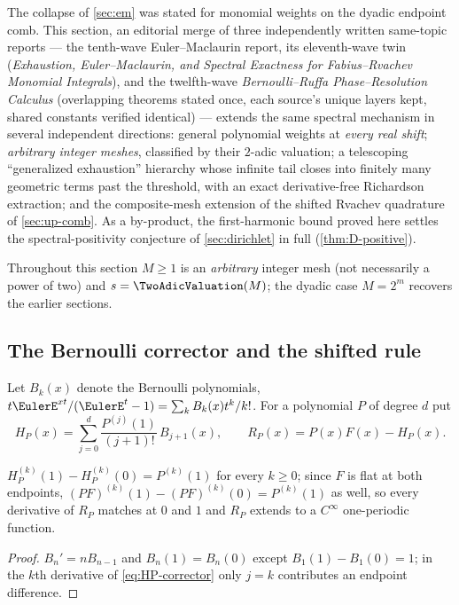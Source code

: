 \documentclass[11pt,oneside]{article}
\numberwithin{equation}{section}
\theoremstyle{definition}
\theoremstyle{remark}
\begin{document}
The collapse of \cref{sec:em} was stated for monomial weights on the
dyadic endpoint comb.  This section, an editorial merge of three
independently written same-topic reports --- the tenth-wave
Euler--Maclaurin report, its eleventh-wave twin (\emph{Exhaustion,
Euler--Maclaurin, and Spectral Exactness for Fabius--Rvachev Monomial
Integrals}), and the twelfth-wave \emph{Bernoulli--Ruffa
Phase--Resolution Calculus} (overlapping theorems stated once, each
source's unique layers kept, shared constants verified identical) ---
extends the same spectral mechanism in several independent
directions: general polynomial weights at \emph{every real
shift}; \emph{arbitrary integer meshes}, classified by their $2$-adic
valuation; a telescoping ``generalized exhaustion'' hierarchy whose
infinite tail closes into finitely many geometric terms past the
threshold, with an exact derivative-free Richardson extraction; and the
composite-mesh extension of the shifted Rvachev quadrature of
\cref{sec:up-comb}.  As a by-product, the first-harmonic bound proved
here settles the spectral-positivity conjecture of
\cref{sec:dirichlet} in full (\cref{thm:D-positive}).

Throughout this section $M\ge1$ is an \emph{arbitrary} integer mesh
(not necessarily a power of two) and $s=\TwoAdicValuation(M)$; the dyadic case
$M=2^{m}$ recovers the earlier sections.

\subsection{The Bernoulli corrector and the shifted rule}

Let $B_k(x)$ denote the Bernoulli polynomials,
$t\EulerE^{xt}/(\EulerE^t-1)=\sum_kB_k(x)t^k/k!$.  For a polynomial $P$ of
degree $d$ put
\begin{equation}
 H_P(x)=\sum_{j=0}^{d}\frac{P^{(j)}(1)}{(j+1)!}\,B_{j+1}(x),
 \qquad
 R_P(x)=P(x)F(x)-H_P(x).
 \label{eq:HP-corrector}
\end{equation}

\begin{lemma}
\label{lem:bern-jump}
$H_P^{(k)}(1)-H_P^{(k)}(0)=P^{(k)}(1)$ for every $k\ge0$; since $F$ is
flat at both endpoints, $(PF)^{(k)}(1)-(PF)^{(k)}(0)=P^{(k)}(1)$ as
well, so every derivative of $R_P$ matches at $0$ and $1$ and $R_P$
extends to a $C^\infty$ one-periodic function.
\end{lemma}

\begin{proof}
$B_n'=nB_{n-1}$ and $B_n(1)=B_n(0)$ except $B_1(1)-B_1(0)=1$; in the
$k$th derivative of \eqref{eq:HP-corrector} only $j=k$ contributes an
endpoint difference.
\end{proof}
\end{document}
